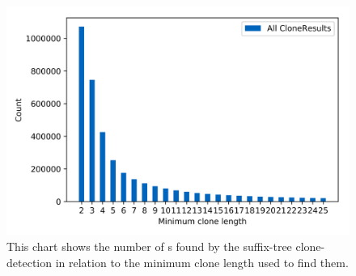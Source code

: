 
\begin{figure}
	\centering
	\includegraphics[width=0.8\linewidth]{figures/Thresholds/raw.png}
	\caption[All found CloneResults in relation to the minimum clone length]{This chart shows the number of s found by the suffix-tree clone-detection in relation to the minimum clone length used to find them.}
	\label{fig:thresholdsAll}
\end{figure}
